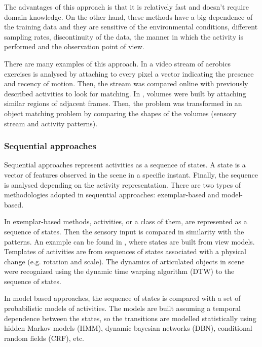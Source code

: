 The advantages of this approach is that it is relatively fast and doesn't require domain knowledge.
On the other hand, these methods have a big dependence of the training data and they are sensitive of the environmental conditions, different sampling rates, discontinuity of the data, the manner in which the activity is performed and the observation point of view. %

There are many examples of this approach.
In \citep{Bobick2001_RecHuMovTemp} a video stream of aerobics exercises is analysed by attaching to every pixel a vector indicating the presence and recency of motion. 
Then, the stream was compared online with previously described activities to look for matching. 
In \citep{Ke2007_SpTmpShapeAR}, volumes were built by attaching similar regions of adjacent frames.
Then, the problem was transformed in an object matching problem by comparing the shapes of the volumes (sensory stream and activity patterns).

\subsubsection{Sequential approaches} %

Sequential approaches represent activities as a sequence of states. 
A state is a vector of features observed in the scene in a specific instant.
Finally, the sequence is analysed depending on the activity representation.
There are two types of methodologies adopted in sequential approaches: exemplar-based and model-based.

In exemplar-based methods, activities, or a class of them, are represented as a sequence of states. 
Then the sensory input is compared in similarity with the patterns.
An example can be found in \citep{Darrell1993_STGestures}, where states are built from view models.
Templates of activities are from sequences of states associated with a physical change (e.g. rotation and scale).
The dynamics of articulated objects in scene were recognized using the dynamic time warping algorithm (DTW) to the sequence of states.

In model based approaches, the sequence of states is compared with a set of probabilistic models of activities. The models are built assuming a temporal dependence between the states, so the transitions are modelled statistically using hidden Markov models (HMM), dynamic bayesian networks (DBN), conditional random fields (CRF), etc.

